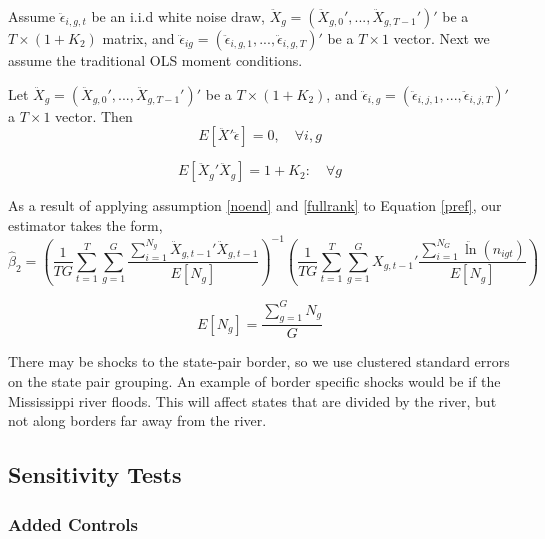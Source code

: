 Assume $\ddot \epsilon_{i,g,t}$ be an i.i.d white noise draw, $\ddot X_{g} = (\ddot X_{g,0}',...,\ddot X_{g,T-1}')'$ be a $T \times (1+K_{2})$ matrix, and $\ddot \epsilon_{ig} = (\ddot \epsilon_{i,g,1},...,\ddot \epsilon_{i,g,T})'$ be a $T \times 1$ vector. Next we assume the traditional OLS moment conditions.

\begin{assumption}\label{noend}
Let  $\ddot X_{g} = (\ddot X_{g,0}', ... ,\ddot X_{g,T-1}')'$ be a $T \times (1+K_{2})$, and $\ddot \epsilon_{i,g} = (\ddot\epsilon_{i,j,1},...,\ddot\epsilon_{i,j,T})'$ a $T \times 1$ vector. Then 
\begin{equation}E[\ddot X'\ddot \epsilon] = 0, \quad \forall i,g\end{equation}
\end{assumption}

\begin{assumption}\label{fullrank}
 \begin{equation}E[\ddot X_{g}'\ddot X_{g}] = 1+K_{2}: \quad \forall g\end{equation}
\end{assumption}

As a result of applying assumption \ref{noend} and \ref{fullrank} to Equation \ref{pref}, our estimator takes the form,
\begin{equation}\label{pols_2s}
\hat \beta_{2} = \left(\frac{1}{TG} \sum_{t=1}^{T}\sum_{g=1}^{G}\frac{\sum_{i=1}^{N_{g}}\ddot X_{g,t-1}'\ddot X_{g,t-1}}{E[N_{g}]}\right)^{-1}\left(\frac{1}{TG}\sum_{t=1}^{T}\sum_{g=1}^{G}X_{g,t-1}'\frac{\sum_{i=1}^{N_{G}}\ddot \ln(n_{igt})}{E[N_{g}]}\right)
\end{equation}

\begin{equation}
E[N_{g}] = \frac{\sum_{g=1}^{G}N_{g}}{G}
\end{equation}

There may be shocks to the state-pair border, so we use clustered standard errors on the state pair grouping. An example of border specific shocks would be if the Mississippi river floods. This will affect states that are divided by the river, but not along borders far away from the river.

\subsection{Sensitivity Tests}

\subsubsection{Added Controls}


